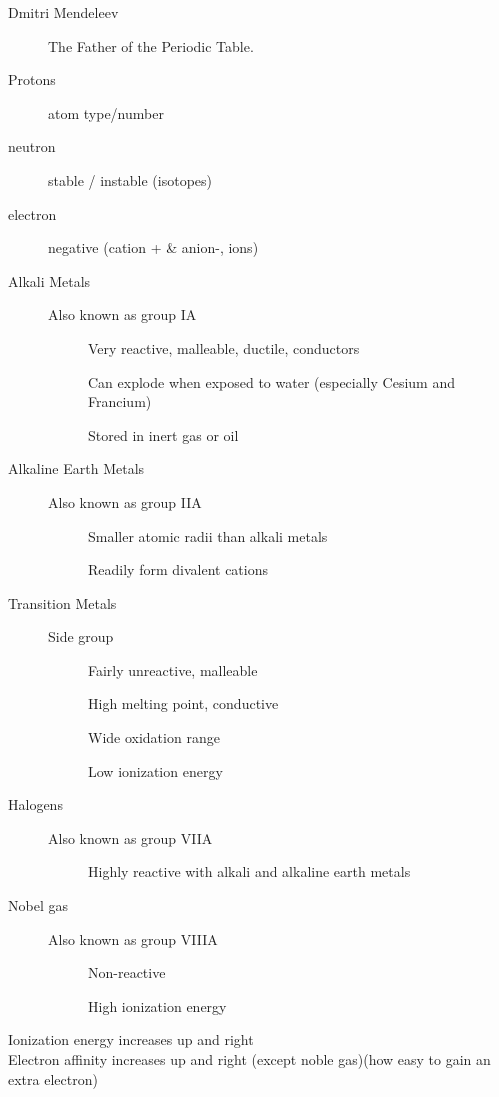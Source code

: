 \begin{description}
    \item[Dmitri Mendeleev] The Father of the Periodic Table.
    \item[Protons] atom type/number
    \item[neutron] stable / instable (isotopes)
    \item[electron] negative (cation + \& anion-, ions)
    \item[Alkali Metals] Also known as group IA
    \begin{description} 
        \item[] Very reactive, malleable, ductile, conductors
        \item[] Can explode when exposed to water (especially Cesium and Francium)
        \item[] Stored in inert gas or oil
    \end{description}
    \item[Alkaline Earth Metals] Also known as group IIA
    \begin{description} 
        \item[] Smaller atomic radii than alkali metals
        \item[] Readily form divalent cations
    \end{description} 
    \item[Transition Metals] Side group
    \begin{description} 
        \item[] Fairly unreactive, malleable
        \item[] High melting point, conductive
        \item[] Wide oxidation range
        \item[] Low ionization energy
    \end{description}
    \item[Halogens] Also known as group VIIA
    \begin{description}
        \item[] Highly reactive with alkali and alkaline earth metals
    \end{description}
    \item[Nobel gas] Also known as group VIIIA
    \begin{description}
        \item[] Non-reactive
        \item[] High ionization energy
    \end{description}
\end{description}
%
Ionization energy increases up and right\\ 
Electron affinity increases up and right (except noble gas)(how easy to gain an extra electron)

